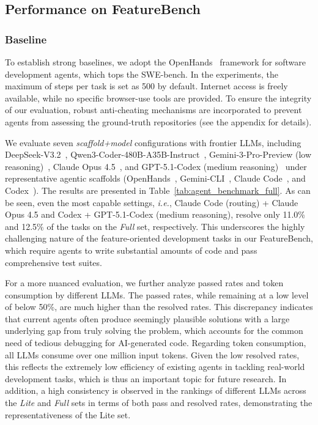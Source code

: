 \documentclass{article}
\def\name{FeatureBench }
\def\namenospace{FeatureBench}
\begin{document}
\subsection{Performance on \name}

\subsubsection{Baseline}

To establish strong baselines, we adopt the OpenHands~\citep{Wang_OpenHands} framework for software development agents, which tops the SWE-bench. In the experiments, the maximum of steps per task is set as 500 by default. Internet access is freely available, while no specific browser-use tools are provided. To ensure the integrity of our evaluation, robust anti-cheating mechanisms are incorporated to prevent agents from assessing the ground-truth repositories (see the appendix for details).

We evaluate seven \emph{scaffold+model} configurations with frontier LLMs, including DeepSeek-V3.2~\citep{deepseek2025v32}, Qwen3-Coder-480B-A35B-Instruct~\citep{qwen2025qwen3coder480b}, Gemini-3-Pro-Preview (low reasoning)~\citep{google2025gemini3docs}, Claude Opus 4.5~\citep{anthropic2025opus45}, and GPT-5.1-Codex (medium reasoning)~\citep{openai2025gpt51codex} under representative agentic scaffolds (OpenHands~\citep{wang2025openhands}, Gemini-CLI~\citep{google_gemini_cli}, Claude Code~\citep{anthropic_claude_code}, and Codex~\citep{openai2025codex}). The results are presented in Table~\ref{tab:agent_benchmark_full}. As can be seen, even the most capable settings, \textit{i.e.}, Claude Code (routing) + Claude Opus 4.5 and Codex + GPT-5.1-Codex (medium reasoning), resolve only 11.0\% and 12.5\% of the tasks on the \textit{Full} set, respectively. This underscores the highly challenging nature of the feature-oriented development tasks in our \namenospace, which require agents to write substantial amounts of code and pass comprehensive test suites. 

For a more nuanced evaluation, we further analyze passed rates and token consumption by different LLMs. The passed rates, while remaining at a low level of below 50\%, are much higher than the resolved rates. This discrepancy indicates that current agents often produce seemingly plausible solutions with a large underlying gap from truly solving the problem, which accounts for the common need of tedious debugging for AI-generated code. Regarding token consumption, all LLMs consume over one million input tokens. Given the low resolved rates, this reflects the extremely low efficiency of existing agents in tackling real-world development tasks, which is thus an important topic for future research. In addition, a high consistency is observed in the rankings of different LLMs across the \textit{Lite} and \textit{Full} sets in terms of both pass and resolved rates, demonstrating the representativeness of the Lite set.
\end{document}
